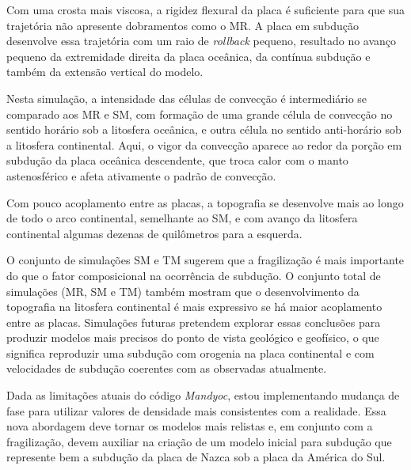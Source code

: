 Com uma crosta mais viscosa, a rigidez flexural da placa é suficiente para que sua trajetória não apresente dobramentos como o MR. A placa em subdução desenvolve essa trajetória com um raio de \textit{rollback} pequeno, resultado no avanço pequeno da extremidade direita da placa oceânica, da contínua subdução e também da extensão vertical do modelo.

Nesta simulação, a intensidade das células de convecção é intermediário se comparado aos MR e SM, com formação de uma grande célula de convecção no sentido horário sob a litosfera oceânica, e outra célula no sentido anti-horário sob a litosfera continental. Aqui, o vigor da convecção aparece ao redor da porção em subdução da placa oceânica descendente, que troca calor com o manto astenosférico e afeta ativamente o padrão de convecção. 

Com pouco acoplamento entre as placas, a topografia se desenvolve mais ao longo de todo o arco continental, semelhante ao SM, e com avanço da litosfera continental algumas dezenas de quilômetros para a esquerda.


O conjunto de simulações SM e TM sugerem que a fragilização é mais importante do que o fator composicional na ocorrência de subdução. O conjunto total de simulações (MR, SM e TM) também mostram que o desenvolvimento da topografia na litosfera continental é mais expressivo se há maior acoplamento entre as placas. Simulações futuras pretendem explorar essas conclusões para produzir modelos mais precisos do ponto de vista geológico e geofísico, o que significa reproduzir uma subdução com orogenia na placa continental e com velocidades de subdução coerentes com as observadas atualmente.

Dada as limitações atuais do código \textit{Mandyoc}, estou implementando mudança de fase para utilizar valores de densidade mais consistentes com a realidade. Essa nova abordagem deve tornar os modelos mais relistas e, em conjunto com a fragilização, devem auxiliar na criação de um modelo inicial para subdução que represente bem a subdução da placa de Nazca sob a placa da América do Sul.









